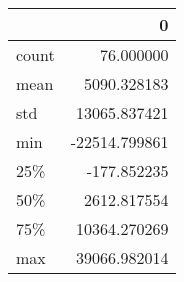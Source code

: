 \begin{tabular}{lr}
\toprule
{} &             0 \\
\midrule
count &     76.000000 \\
mean  &   5090.328183 \\
std   &  13065.837421 \\
min   & -22514.799861 \\
25\%   &   -177.852235 \\
50\%   &   2612.817554 \\
75\%   &  10364.270269 \\
max   &  39066.982014 \\
\bottomrule
\end{tabular}
